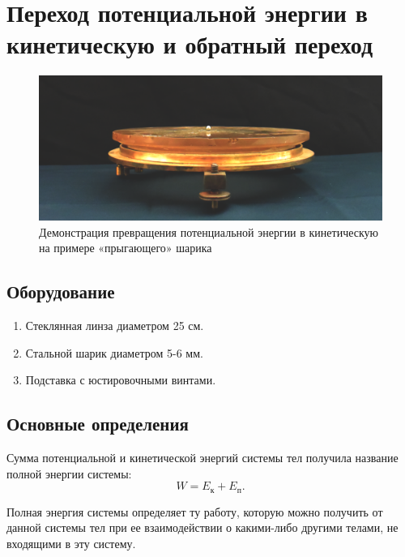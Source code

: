 \documentclass[All.tex]{subfiles}
\begin{document}

	\section{Переход потенциальной энергии в кинетическую и обратный переход}


\begin{figure}[H] 
	\centering 	
	\includegraphics[width=0.8\linewidth]{transform-1.png}
	\caption{Демонстрация превращения потенциальной энергии в кинетическую на примере «прыгающего» шарика}
	\label{transform-1}
\end{figure}

\subsection*{\textcolor{PineGreen}{Оборудование}}

\begin{enumerate}
	\item Стеклянная линза диаметром 25 см. 
	\item Стальной шарик диаметром 5-6 мм.
	\item Подставка с юстировочными винтами.
\end{enumerate}

\subsection*{\textcolor{PineGreen}{Основные определения}}

Сумма потенциальной и кинетической энергий системы тел 
получила название полной энергии системы: 
$$
	W=E_\text{к} + E_\text{п}.
$$

Полная энергия системы определяет ту работу, которую можно 
получить от данной системы тел при ее взаимодействии о какими-либо другими телами, не входящими в эту систему. 
\end{document}
